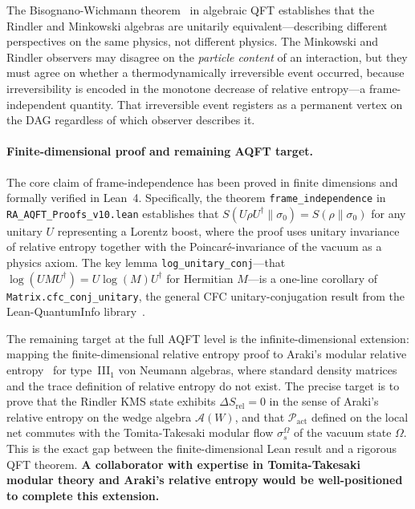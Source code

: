 \documentclass[11pt,a4paper]{article}
\theoremstyle{plain}
\theoremstyle{definition}
\theoremstyle{remark}
\newcommand{\Pact}{\mathcal{P}_{\mathrm{act}}}
\begin{document}
The Bisognano-Wichmann theorem~\citep{BisognanoWichmann1975} in algebraic QFT
establishes that the Rindler and Minkowski algebras are unitarily
equivalent---describing different perspectives on the same physics, not different
physics. The Minkowski and Rindler observers may disagree on the \emph{particle
content} of an interaction, but they must agree on whether a thermodynamically
irreversible event occurred, because irreversibility is encoded in the
monotone decrease of relative entropy---a frame-independent quantity. That
irreversible event registers as a permanent vertex on the DAG regardless of which
observer describes it.

\paragraph{Finite-dimensional proof and remaining AQFT target.}
The core claim of frame-independence has been proved in finite dimensions and
formally verified in Lean~4. Specifically, the theorem
\texttt{frame\_independence} in \texttt{RA\_AQFT\_Proofs\_v10.lean} establishes
that $S(U\rho U^\dagger \| \sigma_0) = S(\rho \| \sigma_0)$ for any unitary $U$
representing a Lorentz boost, where the proof uses unitary invariance of relative
entropy together with the Poincar\'{e}-invariance of the vacuum as a physics
axiom. The key lemma \texttt{log\_unitary\_conj}---that $\log(UMU^\dagger) =
U\log(M)U^\dagger$ for Hermitian $M$---is a one-line corollary of
\texttt{Matrix.cfc\_conj\_unitary}, the general CFC unitary-conjugation result
from the Lean-QuantumInfo library~\citep{Meiburg2025LQI}.

The remaining target at the full AQFT level is the infinite-dimensional
extension: mapping the finite-dimensional relative entropy proof to Araki's modular
relative entropy~\citep{Araki1976} for type~III$_1$ von Neumann algebras, where
standard density matrices and the trace definition of relative entropy do not exist.
The precise target is to prove that the Rindler KMS state exhibits
$\Delta S_{\mathrm{rel}} = 0$ in the sense of Araki's relative entropy on the
wedge algebra $\mathcal{A}(W)$, and that $\Pact$ defined on the local net commutes
with the Tomita-Takesaki modular flow $\sigma_s^{\Omega}$ of the vacuum state
$\Omega$. This is the exact gap between the finite-dimensional Lean result and a
rigorous QFT theorem. \textbf{A collaborator with expertise in Tomita-Takesaki
modular theory and Araki's relative entropy would be well-positioned to complete
this extension.}
\end{document}
